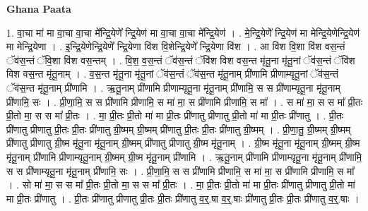\documentclass[17pt]{extarticle}
\begin{document}
\textbf{Ghana Paata } \newline

1. वा॒चा मा॑ मा वा॒चा वा॒चा मे᳚न्द्रि॒येणे᳚ न्द्रि॒येण॑ मा वा॒चा वा॒चा मे᳚न्द्रि॒येण॑ । . मे॒न्द्रि॒येणे᳚ न्द्रि॒येण॑ मा मेन्द्रि॒येणेन्द्रि॒येण॑ मा मेन्द्रि॒येणा । . इ॒न्द्रि॒येणेन्द्रि॒येणे᳚ न्द्रि॒येणा वि॑श वि॒शेन्द्रि॒येणे᳚ न्द्रि॒येणा वि॑श । . आ वि॑श वि॒शा वि॑श वस॒न्तं ॅव॑स॒न्तं ॅवि॒शा वि॑श वस॒न्तम् । . वि॒श॒ व॒स॒न्तं ॅव॑स॒न्तं ॅवि॑श विश वस॒न्त मृ॑तू॒ना मृ॑तू॒नां ॅव॑स॒न्तं ॅवि॑श विश वस॒न्त मृ॑तू॒नाम् । . व॒स॒न्त मृ॑तू॒ना मृ॑तू॒नां ॅव॑स॒न्तं ॅव॑स॒न्त मृ॑तू॒नाम् प्री॑णामि प्रीणाम्यृतू॒नां ॅव॑स॒न्तं ॅव॑स॒न्त मृ॑तू॒नाम् प्री॑णामि । . ऋ॒तू॒नाम् प्री॑णामि प्रीणाम्यृतू॒ना मृ॑तू॒नाम् प्री॑णामि॒ स स प्री॑णाम्यृतू॒ना मृ॑तू॒नाम् प्री॑णामि॒ सः । . प्री॒णा॒मि॒ स स प्री॑णामि प्रीणामि॒ स मा॑ मा॒ स प्री॑णामि प्रीणामि॒ स मा᳚ । . स मा॑ मा॒ स स मा᳚ प्री॒तः प्री॒तो मा॒ स स मा᳚ प्री॒तः । . मा॒ प्री॒तः प्री॒तो मा॑ मा प्री॒तः प्री॑णातु प्रीणातु प्री॒तो मा॑ मा प्री॒तः प्री॑णातु । . प्री॒तः प्री॑णातु प्रीणातु प्री॒तः प्री॒तः प्री॑णातु ग्री॒ष्मम् ग्री॒ष्मम् प्री॑णातु प्री॒तः प्री॒तः प्री॑णातु ग्री॒ष्मम् । . प्री॒णा॒तु॒ ग्री॒ष्मम् ग्री॒ष्मम् प्री॑णातु प्रीणातु ग्री॒ष्म मृ॑तू॒ना मृ॑तू॒नाम् ग्री॒ष्मम् प्री॑णातु प्रीणातु ग्री॒ष्म मृ॑तू॒नाम् । . ग्री॒ष्म मृ॑तू॒ना मृ॑तू॒नाम् ग्री॒ष्मम् ग्री॒ष्म मृ॑तू॒नाम् प्री॑णामि प्रीणाम्यृतू॒नाम् ग्री॒ष्मम् ग्री॒ष्म मृ॑तू॒नाम् प्री॑णामि । . ऋ॒तू॒नाम् प्री॑णामि प्रीणाम्यृतू॒ना मृ॑तू॒नाम् प्री॑णामि॒ स स प्री॑णाम्यृतू॒ना मृ॑तू॒नाम् प्री॑णामि॒ सः । . प्री॒णा॒मि॒ स स प्री॑णामि प्रीणामि॒ स मा॑ मा॒ स प्री॑णामि प्रीणामि॒ स मा᳚ । . सो मा॑ मा॒ स स मा᳚ प्री॒तः प्री॒तो मा॒ स स मा᳚ प्री॒तः । . मा॒ प्री॒तः प्री॒तो मा॑ मा प्री॒तः प्री॑णातु प्रीणातु प्री॒तो मा॑ मा प्री॒तः प्री॑णातु । . प्री॒तः प्री॑णातु प्रीणातु प्री॒तः प्री॒तः प्री॑णातु व॒र्॒.षा व॒र्॒.षाः प्री॑णातु प्री॒तः प्री॒तः प्री॑णातु व॒र्॒.षाः । \newline
\end{document}
